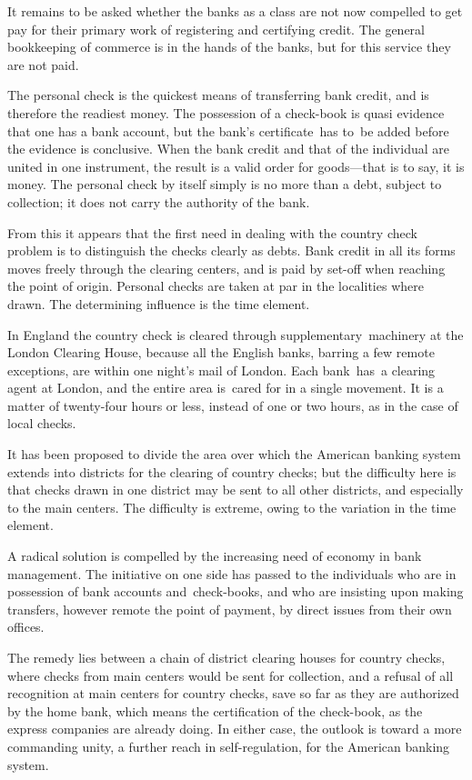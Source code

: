 \documentclass[openany,nobib]{tufte-book}
\begin{document}
It remains to be asked whether the banks as a class are not now
compelled to get pay for their primary work of registering and
certifying credit. The general bookkeeping of commerce is in the hands
of the banks, but for this service they are not paid.~~

The personal check is the quickest means of transferring bank credit,
and is therefore the readiest money. The possession of a check-book is
quasi evidence that one has a bank account, but the bank's
certificate~has to~be added before the evidence is conclusive. When the
bank credit and that of the individual are united in one instrument, the
result is a valid order for goods---that is to say, it is money. The
personal check by itself simply is no more than a debt, subject to
collection; it does not carry the authority of the bank.~

\pagebreak From this it appears that the first need in dealing with the country
check problem is to distinguish the checks clearly as debts. Bank credit
in all its forms moves freely through the clearing centers, and is paid
by set-off when reaching the point of origin. Personal checks are taken
at par in the localities where drawn. The determining influence is the
time element.~

In England the country check is cleared through supplementary~machinery
at the London Clearing House, because all the English banks, barring a
few remote exceptions, are within one night's mail of London. Each
bank~has~a clearing agent at London, and the entire area is~cared for in
a single movement. It is a matter of twenty-four hours or less, instead
of one or two hours, as in the case of local checks.~

It has been proposed to divide the area over which the American banking
system extends into districts for the clearing of country checks; but
the difficulty here is that checks drawn in one district may be sent to
all other districts, and especially to the main centers. The difficulty
is extreme, owing to the variation in the time element.~

A radical solution is compelled by the increasing need of economy in
bank management. The initiative on one side has passed to the
individuals who are in possession of bank accounts and~check-books, and
who are insisting upon making transfers, however remote the point of
payment, by direct issues from their own offices.~

The remedy lies between a chain of district clearing houses for country
checks, where checks from main centers would be sent for collection, and
a refusal of all recognition at main centers for country checks, save so
far as they are authorized by the home bank, which means the
certification of the check-book, as the express companies are already
doing. In either case, the outlook is toward a more commanding unity, a
further reach in self-regulation, for the American banking system.~
\end{document}
